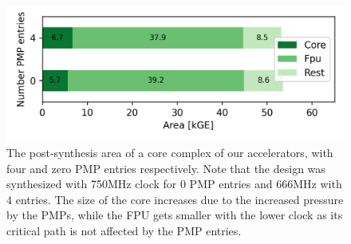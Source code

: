 \begin{figure}
    \centering
    \includegraphics[width=0.9\linewidth]{chapters/PIE/images/graphs/areasnitch.png}
    \vspace{-1em}
    \caption[The post-synthesis area of a core complex of our accelerators]{The post-synthesis area of a core complex of our accelerators, with four and zero PMP entries respectively. Note that the design was synthesized with 750MHz clock for 0 PMP entries and 666MHz with 4 entries. The size of the core increases due to the increased pressure by the PMPs, while the FPU gets smaller with the lower clock as its critical path is not affected by the PMP entries.}
    \label{fig:areasnitch}
\end{figure}

\setcounter{para}{0}



